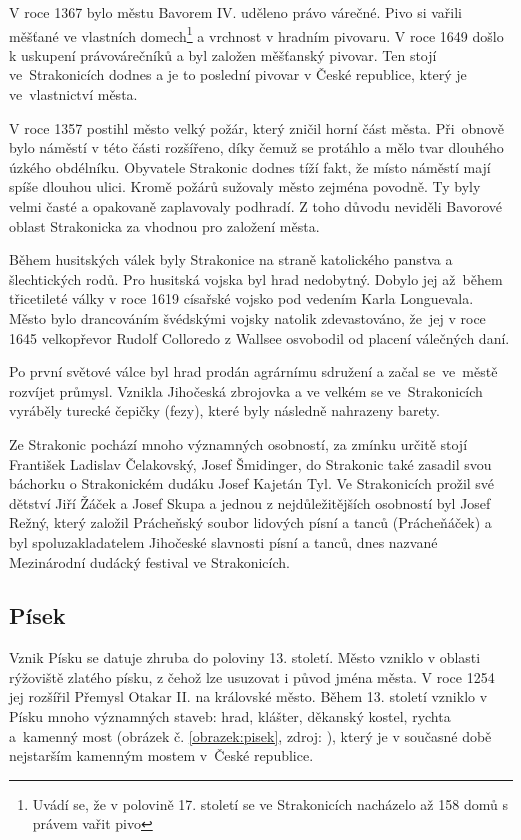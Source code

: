 \documentclass[thesis=M,czech]{FITthesis}[2012/06/26]
\begin{document}
V roce 1367 bylo městu Bavorem IV. uděleno právo várečné. Pivo si vařili měšťané ve vlastních domech\footnote{Uvádí se, že v polovině 17. století se ve Strakonicích nacházelo až 158 domů s právem vařit pivo} a vrchnost v hradním pivovaru. V roce 1649 došlo k uskupení právovárečníků a byl založen měšťanský pivovar. Ten stojí ve~Strakonicích dodnes a je to poslední pivovar v České republice, který je ve~vlastnictví města. 

V roce 1357 postihl město velký požár, který zničil horní část města. Při~obnově bylo náměstí v této části rozšířeno, díky čemuž se protáhlo a mělo tvar dlouhého úzkého obdélníku. Obyvatele Strakonic dodnes tíží fakt, že místo náměstí mají spíše dlouhou ulici. Kromě požárů sužovaly město zejména povodně. Ty byly velmi časté a opakovaně zaplavovaly podhradí. Z toho důvodu neviděli Bavorové oblast Strakonicka za vhodnou pro založení města.

Během husitských válek byly Strakonice na straně katolického panstva a šlechtických rodů. Pro husitská vojska byl hrad nedobytný. Dobylo jej až~během třicetileté války v roce 1619 císařské vojsko pod vedením Karla Longuevala. Město bylo drancováním švédskými vojsky natolik zdevastováno, že~jej v roce 1645 velkopřevor Rudolf Colloredo z Wallsee osvobodil od placení válečných daní.

Po první světové válce byl hrad prodán agrárnímu sdružení a začal se~ve~městě rozvíjet průmysl. Vznikla Jihočeská zbrojovka a ve velkém se ve~Strakonicích vyráběly turecké čepičky (fezy), které byly následně nahrazeny barety. 

Ze Strakonic pochází mnoho významných osobností, za zmínku určitě stojí František Ladislav Čelakovský, Josef Šmidinger, do Strakonic také zasadil svou báchorku o Strakonickém dudáku Josef Kajetán Tyl. Ve Strakonicích prožil své dětství Jiří Žáček a Josef Skupa a jednou z nejdůležitějších osobností byl Josef Režný, který založil Prácheňský soubor lidových písní a tanců (Prácheňáček) a byl spoluzakladatelem Jihočeské slavnosti písní a tanců, dnes nazvané Mezinárodní dudácký festival ve Strakonicích. \cite{obce}


\subsection{Písek}
Vznik Písku se datuje zhruba do poloviny 13. století. Město vzniklo v oblasti rýžoviště zlatého písku, z čehož lze usuzovat i původ jména města. V roce 1254 jej rozšířil Přemysl Otakar II. na královské město. Během 13. století vzniklo v Písku mnoho významných staveb: hrad, klášter, děkanský kostel, rychta a~kamenný most (obrázek č. \ref{obrazek:pisek}, zdroj: \cite{pisek}), který je v současné době nejstarším kamenným mostem v~České republice. 
\end{document}
